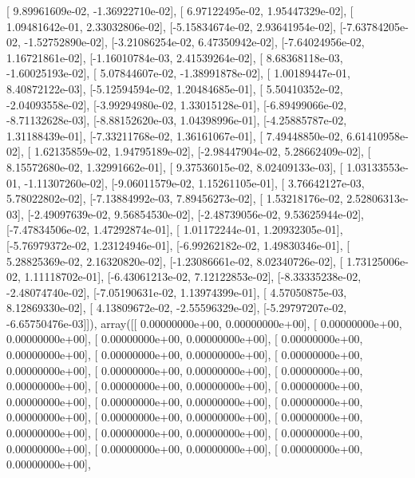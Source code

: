 \documentclass{article}
\begin{document}
       [ 9.89961609e-02, -1.36922710e-02],
       [ 6.97122495e-02,  1.95447329e-02],
       [ 1.09481642e-01,  2.33032806e-02],
       [-5.15834674e-02,  2.93641954e-02],
       [-7.63784205e-02, -1.52752890e-02],
       [-3.21086254e-02,  6.47350942e-02],
       [-7.64024956e-02,  1.16721861e-02],
       [-1.16010784e-03,  2.41539264e-02],
       [ 8.68368118e-03, -1.60025193e-02],
       [ 5.07844607e-02, -1.38991878e-02],
       [ 1.00189447e-01,  8.40872122e-03],
       [-5.12594594e-02,  1.20484685e-01],
       [ 5.50410352e-02, -2.04093558e-02],
       [-3.99294980e-02,  1.33015128e-01],
       [-6.89499066e-02, -8.71132628e-03],
       [-8.88152620e-03,  1.04398996e-01],
       [-4.25885787e-02,  1.31188439e-01],
       [-7.33211768e-02,  1.36161067e-01],
       [ 7.49448850e-02,  6.61410958e-02],
       [ 1.62135859e-02,  1.94795189e-02],
       [-2.98447904e-02,  5.28662409e-02],
       [ 8.15572680e-02,  1.32991662e-01],
       [ 9.37536015e-02,  8.02409133e-03],
       [ 1.03133553e-01, -1.11307260e-02],
       [-9.06011579e-02,  1.15261105e-01],
       [ 3.76642127e-03,  5.78022802e-02],
       [-7.13884992e-03,  7.89456273e-02],
       [ 1.53218176e-02,  2.52806313e-03],
       [-2.49097639e-02,  9.56854530e-02],
       [-2.48739056e-02,  9.53625944e-02],
       [-7.47834506e-02,  1.47292874e-01],
       [ 1.01172244e-01,  1.20932305e-01],
       [-5.76979372e-02,  1.23124946e-01],
       [-6.99262182e-02,  1.49830346e-01],
       [ 5.28825369e-02,  2.16320820e-02],
       [-1.23086661e-02,  8.02340726e-02],
       [ 1.73125006e-02,  1.11118702e-01],
       [-6.43061213e-02,  7.12122853e-02],
       [-8.33335238e-02, -2.48074740e-02],
       [-7.05190631e-02,  1.13974399e-01],
       [ 4.57050875e-03,  8.12869330e-02],
       [ 4.13809672e-02, -2.55596329e-02],
       [-5.29797207e-02, -6.65750476e-03]]), array([[ 0.00000000e+00,  0.00000000e+00],
       [ 0.00000000e+00,  0.00000000e+00],
       [ 0.00000000e+00,  0.00000000e+00],
       [ 0.00000000e+00,  0.00000000e+00],
       [ 0.00000000e+00,  0.00000000e+00],
       [ 0.00000000e+00,  0.00000000e+00],
       [ 0.00000000e+00,  0.00000000e+00],
       [ 0.00000000e+00,  0.00000000e+00],
       [ 0.00000000e+00,  0.00000000e+00],
       [ 0.00000000e+00,  0.00000000e+00],
       [ 0.00000000e+00,  0.00000000e+00],
       [ 0.00000000e+00,  0.00000000e+00],
       [ 0.00000000e+00,  0.00000000e+00],
       [ 0.00000000e+00,  0.00000000e+00],
       [ 0.00000000e+00,  0.00000000e+00],
       [ 0.00000000e+00,  0.00000000e+00],
       [ 0.00000000e+00,  0.00000000e+00],
       [ 0.00000000e+00,  0.00000000e+00],
\end{document}
